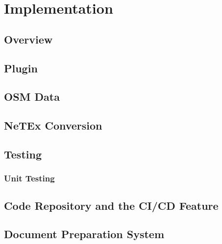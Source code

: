 \chapter{Implementation}
\section{Overview}
\lipsum[4-5]

\section{Plugin}
\lipsum[4-6]

\section{OSM Data}
\lipsum[7-9]

\section{NeTEx Conversion}
\lipsum[10-13]

\section{Testing}
\lipsum[7-8]
\subsection{Unit Testing}
\lipsum[5-6]
\newpage
\section{Code Repository and the CI/CD Feature}
\label{sec:GitLab}
\lipsum[7-8]	
\section{Document Preparation System}
\lipsum[10-11]
